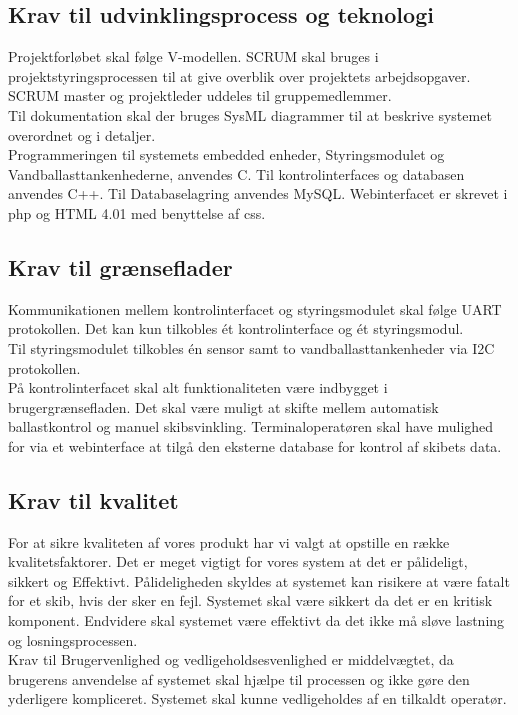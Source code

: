 \subsection{Krav til udvinklingsprocess og teknologi}
Projektforløbet skal følge V-modellen. SCRUM skal bruges i projektstyringsprocessen til at give overblik over projektets arbejdsopgaver. SCRUM master og projektleder uddeles til gruppemedlemmer.\\
Til dokumentation skal der bruges SysML diagrammer til at beskrive systemet overordnet og i detaljer.\\
Programmeringen til systemets embedded enheder, Styringsmodulet og Vandballasttankenhederne, anvendes C. Til kontrolinterfaces og databasen anvendes C++. Til Databaselagring anvendes MySQL. Webinterfacet er skrevet i php og HTML 4.01 med benyttelse af css.

\subsection{Krav til grænseflader}
Kommunikationen mellem kontrolinterfacet og styringsmodulet skal følge UART protokollen. Det kan kun tilkobles ét kontrolinterface og ét styringsmodul.\\
Til styringsmodulet tilkobles én sensor samt to vandballasttankenheder via I2C protokollen.\\
På kontrolinterfacet skal alt funktionaliteten være indbygget i brugergrænsefladen. Det skal være muligt at skifte mellem automatisk ballastkontrol og manuel skibsvinkling. 
Terminaloperatøren skal have mulighed for via et webinterface at tilgå den eksterne database for kontrol af skibets data.

\subsection{Krav til kvalitet}
For at sikre kvaliteten af vores produkt har vi valgt at opstille en række kvalitetsfaktorer. Det er meget vigtigt for vores system at det er pålideligt, sikkert og Effektivt. Pålideligheden skyldes at systemet kan risikere at være fatalt for et skib, hvis der sker en fejl. Systemet skal være sikkert da det er en kritisk komponent. Endvidere skal systemet være effektivt da det ikke må sløve lastning og losningsprocessen.\\
Krav til Brugervenlighed og vedligeholdsesvenlighed er middelvægtet, da brugerens anvendelse af systemet skal hjælpe til processen og ikke gøre den yderligere kompliceret. Systemet skal kunne vedligeholdes af en tilkaldt operatør.\\
